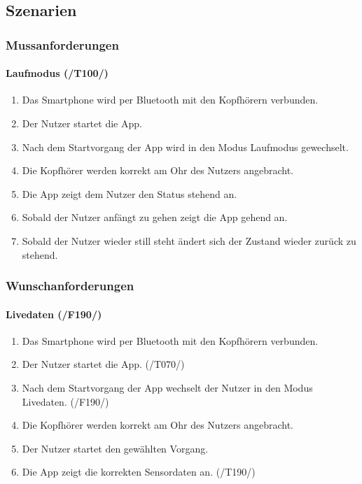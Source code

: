\documentclass[a4paper,12pt]{article}
\begin{document}
  \subsection{Szenarien}
    \subsubsection{Mussanforderungen}
      \paragraph{Laufmodus (/T100/)}
      \begin{enumerate}
        \item Das Smartphone wird per Bluetooth mit den Kopfhörern verbunden.
        \item Der Nutzer startet die App.
        \item Nach dem Startvorgang der App wird in den Modus \glqq Laufmodus\grqq{} gewechselt.
        \item Die Kopfhörer werden korrekt am Ohr des Nutzers angebracht.
        \item Die App zeigt dem Nutzer den Status \glqq stehend\grqq{} an.
        \item Sobald der Nutzer anfängt zu gehen zeigt die App \glqq gehend\grqq{} an.
        \item Sobald der Nutzer wieder still steht ändert sich der Zustand wieder zurück zu \glqq stehend\grqq. 
      \end{enumerate}

    \subsubsection{Wunschanforderungen}
        
    \paragraph{Livedaten (/F190/)}
      \begin{enumerate}
        \item Das Smartphone wird per Bluetooth mit den Kopfhörern verbunden.
        \item Der Nutzer startet die App. (/T070/)
        \item Nach dem Startvorgang der App wechselt der Nutzer in den Modus \glqq Livedaten\grqq . (/F190/)
        \item Die Kopfhörer werden korrekt am Ohr des Nutzers angebracht.
        \item Der Nutzer startet den gewählten \Gls{Vorgang}.
        \item Die App zeigt die korrekten Sensordaten an. (/T190/)
      \end{enumerate}
\end{document}
